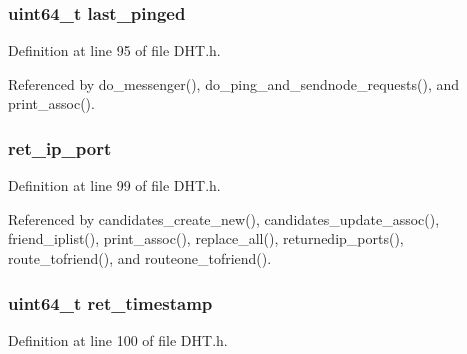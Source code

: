 \hypertarget{struct_i_p_p_ts_png_a4049204f6c392628d31be6c39f03e031}{
\subsubsection[{last\+\_\+pinged}]{\setlength{\rightskip}{0pt plus 5cm}uint64\+\_\+t last\+\_\+pinged}}\label{struct_i_p_p_ts_png_a4049204f6c392628d31be6c39f03e031}


Definition at line 95 of file D\+H\+T.\+h.



Referenced by do\+\_\+messenger(), do\+\_\+ping\+\_\+and\+\_\+sendnode\+\_\+requests(), and print\+\_\+assoc().

\hypertarget{struct_i_p_p_ts_png_a28f2dcc657352ee4855d05ed42e4a4af}{
\subsubsection[{ret\+\_\+ip\+\_\+port}]{ ret\+\_\+ip\+\_\+port}}\label{struct_i_p_p_ts_png_a28f2dcc657352ee4855d05ed42e4a4af}


Definition at line 99 of file D\+H\+T.\+h.



Referenced by candidates\+\_\+create\+\_\+new(), candidates\+\_\+update\+\_\+assoc(), friend\+\_\+iplist(), print\+\_\+assoc(), replace\+\_\+all(), returnedip\+\_\+ports(), route\+\_\+tofriend(), and routeone\+\_\+tofriend().

\hypertarget{struct_i_p_p_ts_png_a5a40b83400feebb632862f593ad5e4a7}{
\subsubsection[{ret\+\_\+timestamp}]{\setlength{\rightskip}{0pt plus 5cm}uint64\+\_\+t ret\+\_\+timestamp}}\label{struct_i_p_p_ts_png_a5a40b83400feebb632862f593ad5e4a7}


Definition at line 100 of file D\+H\+T.\+h.



